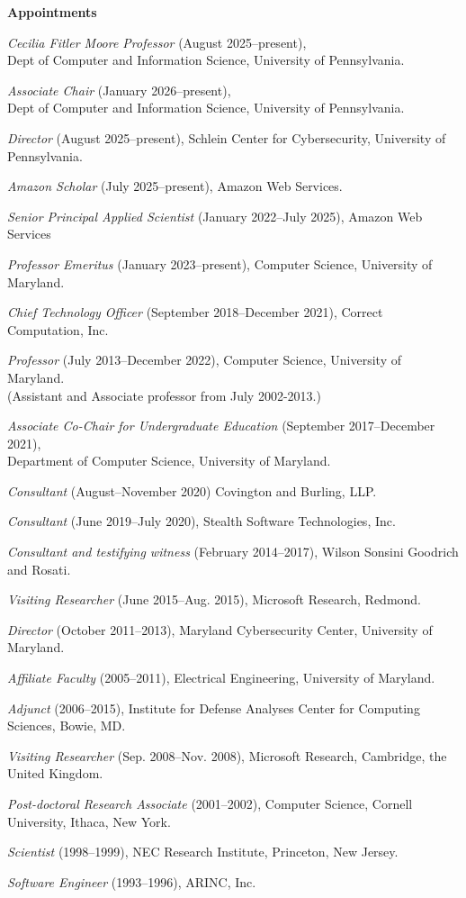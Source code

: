 \documentclass[11pt]{article}
\begin{document}
\begin{description}
\setlength{\labelsep}{0ex}
\setlength{\itemsep}{-0.5ex}

\item {\bf\textsf Appointments} 

 
\item {\em Cecilia Fitler Moore Professor} (August 2025--present), \\ Dept of Computer and Information Science, University of Pennsylvania.
\item {\em Associate Chair} (January 2026--present), \\ Dept of Computer and Information Science, University of Pennsylvania.
\item {\em Director} (August 2025--present), Schlein Center for Cybersecurity, University of Pennsylvania.
\item {\em Amazon Scholar} (July 2025--present), Amazon Web Services.
\item {\em Senior Principal Applied Scientist} (January 2022--July 2025), Amazon Web Services
\item {\em Professor Emeritus} (January 2023--present), Computer Science, University of Maryland.
\item {\em Chief Technology Officer} (September 2018--December 2021), Correct Computation, Inc.
\item {\em Professor} (July 2013--December 2022), Computer Science, University of Maryland.\\ (Assistant and Associate professor from July 2002-2013.)
\item {\em Associate Co-Chair for Undergraduate Education} (September 2017--December 2021), \\ Department of Computer Science, University of Maryland.
\item {\em Consultant} (August--November 2020) Covington and Burling, LLP.
\item {\em Consultant} (June 2019--July 2020), Stealth Software Technologies, Inc.
\item {\em Consultant and testifying witness} (February 2014–2017), Wilson Sonsini Goodrich and Rosati.
\item {\em Visiting Researcher} (June 2015--Aug. 2015), Microsoft
  Research, Redmond.
\item {\em Director} (October 2011--2013), Maryland Cybersecurity
  Center, University of Maryland.
\item {\em Affiliate Faculty} (2005--2011), Electrical
  Engineering, University of Maryland.
\item {\em Adjunct} (2006--2015), Institute for Defense Analyses
   Center for Computing Sciences, Bowie, MD.
\item {\em Visiting Researcher} (Sep. 2008--Nov. 2008), Microsoft
  Research, Cambridge, the United Kingdom.
\item {\em Post-doctoral Research Associate} (2001--2002), Computer Science,
  Cornell University, Ithaca, New York. 
\item {\em Scientist} (1998--1999), NEC Research Institute, Princeton,
  New Jersey. 
\item {\em Software Engineer} (1993--1996), ARINC, Inc.
\end{description}
\end{document}
